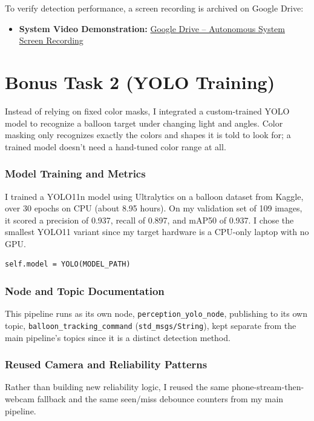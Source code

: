 \documentclass[12pt,a4paper]{article}
\begin{document}
To verify detection performance, a screen recording is archived on
Google Drive:

\begin{itemize}
    \item \textbf{System Video Demonstration:} \href{https://drive.google.com/file/d/13cAQ1OQS0qfvj-SdfDICUSn8_SfnbNMW/view?usp=sharing}{Google Drive -- Autonomous System Screen Recording}
\end{itemize}

\section{Bonus Task 2 (YOLO Training)}

Instead of relying on fixed color masks, I integrated a custom-trained
YOLO model to recognize a balloon target under changing light and
angles. Color masking only recognizes exactly the colors and shapes it
is told to look for; a trained model doesn't need a hand-tuned color
range at all.

\subsubsection{Model Training and Metrics}
I trained a YOLO11n model using Ultralytics on a balloon dataset from
Kaggle, over 30 epochs on CPU (about 8.95 hours). On my validation set
of 109 images, it scored a precision of 0.937, recall of 0.897, and
mAP50 of 0.937. I chose the smallest YOLO11 variant since my target
hardware is a CPU-only laptop with no GPU.

\begin{lstlisting}[style=pythonstyle, caption={Loading the trained model once at startup.}]
self.model = YOLO(MODEL_PATH)
\end{lstlisting}

\subsubsection{Node and Topic Documentation}
This pipeline runs as its own node, \texttt{perception\_yolo\_node},
publishing to its own topic, \texttt{balloon\_tracking\_command}
(\texttt{std\_msgs/String}), kept separate from the main pipeline's
topics since it is a distinct detection method.

\subsubsection{Reused Camera and Reliability Patterns}
Rather than building new reliability logic, I reused the same
phone-stream-then-webcam fallback and the same seen/miss debounce
counters from my main pipeline.
\end{document}
